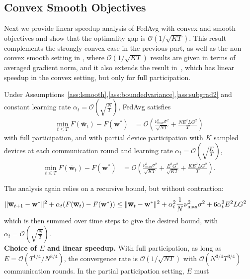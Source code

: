 \subsection{Convex Smooth Objectives}
Next we provide linear speedup analysis of FedAvg with convex and
smooth objectives and show that the optimality gap is $\mathcal{O}(1/\sqrt{KT})$. 
This result complements the strongly convex case in the previous part, as well as the non-convex
smooth setting in \cite{jiang2018linear,yu2019parallel,haddadpour2019convergence},
where $\mathcal{O}(1/\sqrt{KT})$ results are given in terms of averaged
gradient norm, and it also extends the result in~\cite{khaled2020tighter}, which has linear speedup in the convex setting, but only for full participation.
\begin{theorem}
	\label{thm:SGD_cvx}Under Assumptions~\ref{ass:lsmooth},\ref{ass:boundedvariance},\ref{ass:subgrad2} and constant learning
	rate $\alpha_{t}=\mathcal{O}(\sqrt{\frac{N}{T}})$, FedAvg satisfies
	\begin{align*}
	\min_{t\leq T}F(\overline{\mathbf{w}}_{t})-F(\mathbf{w}^{\ast}) & =\mathcal{O}\left(\frac{\nu_{\max}^{2}\sigma^{2}}{\sqrt{NT}}+\frac{NE^{2}LG^{2}}{T}\right)
	\end{align*}
	with full participation, and with partial device participation with $K$ sampled devices at
	each communication round and learning rate $\alpha_{t}=\mathcal{O}(\sqrt{\frac{K}{T}})$,
	\begin{align*}
	\min_{t\leq T}F(\overline{\mathbf{w}}_{t})-F(\mathbf{w}^{\ast}) & =\mathcal{O}\left(\frac{\nu_{\max}^{2}\sigma^{2}}{\sqrt{KT}}+\frac{E^{2}G^{2}}{\sqrt{KT}}+\frac{KE^{2}LG^{2}}{T}\right).
	\end{align*}
\end{theorem}
The analysis again relies on a recursive bound, but without contraction: 
\begin{align*}
	\|{\overline{\mathbf{w}}}_{t+1}-{\mathbf{w}}^{\ast}\|^{2}+\alpha_{t}(F({\overline{\mathbf{w}}}_{t})-F({\mathbf{w}}^{\ast})) & \leq\|{\overline{\mathbf{w}}}_{t}-{\mathbf{w}}^{\ast}\|^{2}+\alpha_{t}^{2}\frac{1}{N}\nu_{\max}^{2}\sigma^{2}+6\alpha_{t}^{3}E^{2}LG^{2}
	\end{align*}
which is then summed over time steps to give the desired bound, with $\alpha_{t}=\mathcal{O}(\sqrt{\frac{N}{T}})$. \\
%
\textbf{Choice of $E$ and linear speedup. }With full participation,
as long as $E=\mathcal{O}(T^{1/4}/N^{3/4})$, the convergence
rate is $\mathcal{O}(1/\sqrt{NT})$ with $\mathcal{O}(N^{3/4}T^{3/4})$
communication rounds. In the partial participation setting, $E$ must
